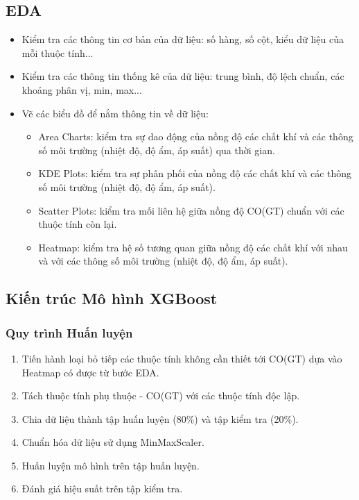 \subsection{EDA}
\begin{itemize}
    \item Kiểm tra các thông tin cơ bản của dữ liệu: số hàng, số cột, kiểu dữ liệu của mỗi thuộc tính...
    \item Kiểm tra các thông tin thống kê của dữ liệu: trung bình, độ lệch chuẩn, các khoảng phân vị, min, max...
    \item Vẽ các biểu đồ để nắm thông tin về dữ liệu: 
    \begin{itemize}
        \item Area Charts: kiểm tra sự dao động của nồng độ các chất khí và các thông số môi trường (nhiệt độ, độ ẩm, áp suất) qua thời gian. 
        \item KDE Plots: kiểm tra sự phân phối của nồng độ các chất khí và các thông số môi trường (nhiệt độ, độ ẩm, áp suất). 
        \item Scatter Plots: kiểm tra mối liên hệ giữa nồng độ CO(GT) chuẩn với các thuộc tính còn lại. 
        \item Heatmap: kiểm tra hệ số tương quan giữa nồng độ các chất khí với nhau và với các thông số môi trường (nhiệt độ, độ ẩm, áp suất). 
    \end{itemize}
\end{itemize}

\subsection{Kiến trúc Mô hình XGBoost}

\subsubsection{Quy trình Huấn luyện}
\begin{enumerate}
    \item Tiến hành loại bỏ tiếp các thuộc tính không cần thiết tới CO(GT) dựa vào Heatmap có được từ bước EDA. 
    \item Tách thuộc tính phụ thuộc - CO(GT) với các thuộc tính độc lập. 
    \item Chia dữ liệu thành tập huấn luyện (80\%) và tập kiểm tra (20\%).
    \item Chuẩn hóa dữ liệu sử dụng MinMaxScaler.
    \item Huấn luyện mô hình trên tập huấn luyện.
    \item Đánh giá hiệu suất trên tập kiểm tra.
\end{enumerate}

